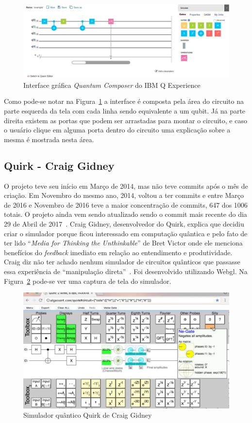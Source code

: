\documentclass[a4paper, 12pt, oneside]{book}
\begin{document}
\begin{figure}[H]
\centering
\includegraphics[scale=0.36]{ibmq.png}
\caption{Interface gráfica \textit{Quantum Composer} do IBM Q Experience}
\label{fig:ibmq}
\end{figure}

Como pode-se notar na Figura~\ref{fig:ibmq} a interface é composta pela área do circuito na parte esquerda da tela com cada linha sendo equivalente a um qubit. Já na parte direita existem as portas que podem ser arrastadas para montar o circuito, e caso o usuário clique em alguma porta dentro do circuito uma explicação sobre a mesma é mostrada nesta área.

\subsection{Quirk - Craig Gidney}

O projeto teve seu início em Março de 2014, mas não teve commits após o mês de criação. Em Novembro do mesmo ano, 2014, voltou a ter commits e entre Março de 2016 e Novembro de 2016 teve a maior concentração de commits, 647 dos 1006 totais. O projeto ainda vem sendo atualizado sendo o commit mais recente do dia 29 de Abril de 2017~\cite{gitquirk}. Craig Gidney, desenvolvedor do Quirk, explica que decidiu criar o simulador porque ficou interessado em computação quântica e pelo fato de ter lido ``\textit{Media for Thinking the Unthinkable}'' de Bret Victor onde ele menciona benefícios do \textit{feedback} imediato em relação ao entendimento e produtividade. Craig diz não ter achado nenhum simulador de circuitos quânticos que passasse essa experiência de ``manipulação direta''~\cite{quirk}. Foi desenvolvido utilizando Webgl. Na Figura~\ref{fig:quirk} pode-se ver uma captura de tela do simulador.

\begin{figure}[hbtp]
\centering
\includegraphics[scale=0.36]{quirk.jpg}
\caption{Simulador quântico Quirk de Craig Gidney}
\label{fig:quirk}
\end{figure}
\end{document}
